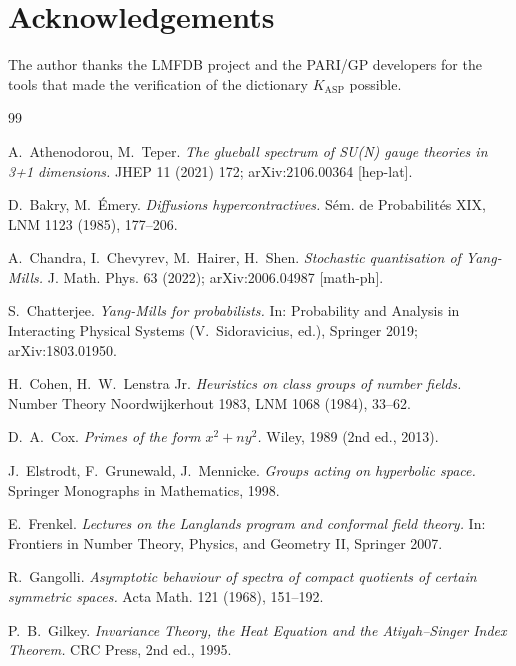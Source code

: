 \documentclass[11pt,a4paper]{article}
\theoremstyle{definition}
\newcommand{\KASP}{K_{\mathrm{ASP}}}
\begin{document}
\section*{Acknowledgements}

The author thanks the LMFDB project and the PARI/GP developers for the tools
that made the verification of the dictionary $\KASP$ possible.

\begin{thebibliography}{99}

 A.~Athenodorou, M.~Teper. \emph{The glueball spectrum of
SU(N) gauge theories in 3+1 dimensions.} JHEP 11 (2021) 172;
arXiv:2106.00364 [hep-lat].

 D.~Bakry, M.~\'Emery. \emph{Diffusions hypercontractives.}
Sém. de Probabilités XIX, LNM 1123 (1985), 177--206.

 A.~Chandra, I.~Chevyrev, M.~Hairer, H.~Shen.
\emph{Stochastic quantisation of Yang-Mills.}
J. Math. Phys. 63 (2022); arXiv:2006.04987 [math-ph].

 S.~Chatterjee. \emph{Yang-Mills for probabilists.}
In: Probability and Analysis in Interacting Physical Systems (V.~Sidoravicius, ed.),
Springer 2019; arXiv:1803.01950.

 H.~Cohen, H.~W.~Lenstra Jr.
\emph{Heuristics on class groups of number fields.}
Number Theory Noordwijkerhout 1983, LNM 1068 (1984), 33--62.

 D.~A.~Cox. \emph{Primes of the form $x^2 + ny^2$.}
Wiley, 1989 (2nd ed., 2013).

 J.~Elstrodt, F.~Grunewald, J.~Mennicke.
\emph{Groups acting on hyperbolic space.}
Springer Monographs in Mathematics, 1998.

 E.~Frenkel.
\emph{Lectures on the Langlands program and conformal field theory.}
In: Frontiers in Number Theory, Physics, and Geometry II, Springer 2007.

 R.~Gangolli. \emph{Asymptotic behaviour of spectra of
compact quotients of certain symmetric spaces.}
Acta Math. 121 (1968), 151--192.

 P.~B.~Gilkey. \emph{Invariance Theory, the Heat Equation
and the Atiyah--Singer Index Theorem.} CRC Press, 2nd ed., 1995.


\end{thebibliography}
\end{document}
